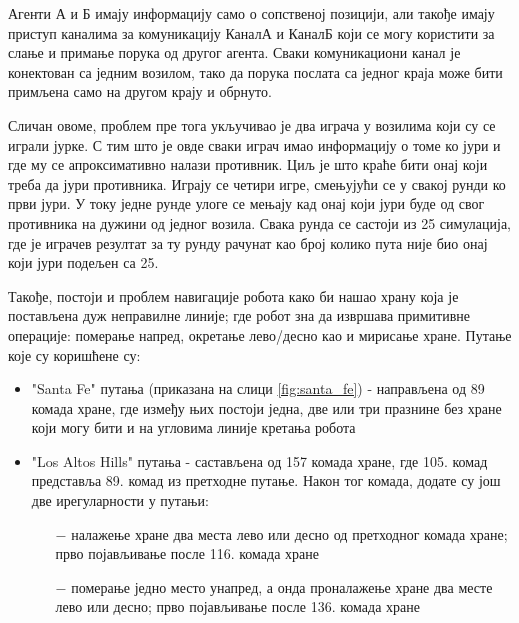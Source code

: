 \documentclass[a4paper]{article}
\begin{document}
Агенти А и Б имају информацију само о сопственој позицији, али такође имају приступ каналима за комуникацију КаналА и КаналБ који се могу користити за слање и примање порука од другог агента. Сваки комуникациони канал је конектован са једним возилом, тако да порука послата са једног краја може бити примљена само на другом крају и обрнуто. \cite{robo0}

Сличан овоме, проблем пре тога укључивао је два играча у возилима који су се играли јурке. С тим што је овде сваки играч имао информацију о томе ко јури и где му се апроксимативно налази противник. Циљ је што краће бити онај који треба да јури противника. Играју се четири игре, смењујући се у свакој рунди ко први јури. У току једне рунде улоге се мењају кад онај који јури буде од свог противника на дужини од једног возила. Свака рунда се састоји из 25 симулација, где је играчев резултат за ту рунду рачунат као број колико пута није био онај који јури подељен са 25. \cite{robo1}

Такође, постоји и проблем навигације робота како би нашао храну која је постављена дуж неправилне линије; где робот зна да извршава примитивне операције: померање напред, окретање лево/десно као и мирисање хране. Путање које су коришћене су:
\begin{itemize}
	\item "Santa Fe" путања (приказана на слици \ref{fig:santa_fe}) - направљена од 89 комада хране, где између њих постоји једна, две или три празнине без хране који могу бити и на угловима линије кретања робота
	\item "Los Altos Hills" путања - састављена од 157 комада хране, где 105. комад представља 89. комад из претходне путање. Након тог комада, додате су још две ирегуларности у путањи:
	\begin{itemize}
		\item[$-$] налажење хране два места лево или десно од претходног комада хране; прво појављивање после 116. комада хране 
		\item[$-$] померање једно место унапред, а онда проналажење хране два месте лево или десно; прво појављивање после 136. комада хране
	\end{itemize}
\end{itemize}
\end{document}
